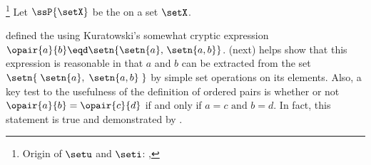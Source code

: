 \begin{definition}
\label{def:set_ops}
\footnote{Origin of $\setu$ and $\seti$: , }
Let $\ssP{\setX}$ be the   on a set $\setX$.
\end{definition}


 defined the  using Kuratowski's
somewhat cryptic expression
 $\opair{a}{b} \eqd \setn{\setn{a},\, \setn{a,b}}$.
 (next) helps show that this expression is reasonable
in that $a$ and $b$ can be extracted
from the set $\setn{\; \setn{a},\; \setn{a,b}\; }$
by simple set operations on its elements.
Also, a key test to the usefulness of the definition of ordered pairs is whether
or not $\opair{a}{b}=\opair{c}{d}$ if and only if $a=c \text{ and } b=d$.
In fact, this statement is true and demonstrated by .

\begin{theorem}
\label{thm:(a,b)_extract}
\end{theorem}


